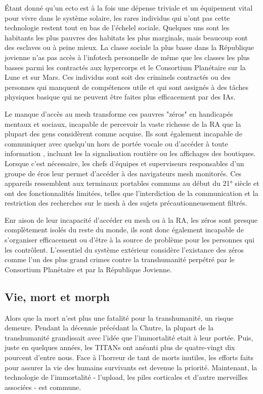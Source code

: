                Étant donné qu'un ecto est à la fois une dépense triviale et un équipement vital pour vivre dans le système solaire, les rares individus qui n'ont pas cette technologie restent tout en bas de l'échelel sociale. Quelques uns sont les habitants les plus pauvres des habitats les plus marginals, mais beaucoup sont des esclaves ou à peine mieux. La classe sociale la plus basse dans la République jovienne n'as pas accès à l'infotech personnelle de même que les classes les plus basses parmi les contractés aux hypercorps et le Consortium Planétaire sur la Lune et sur Mars. Ces individus sont soit des criminels contractés ou des personnes qui manquent de compétences utile et qui sont assignés à des tâches physiques basique qui ne peuvent être faites plus efficacement par des IAs. 

               Le manque d'accès au mesh transforme ces pauvres "zéros" en handicapés mentaux et sociaux, incapable de percevoir la vaste richesse de la RA que la plupart des gens considèrent comme acquise. Ils sont également incapable de communiquer avec quelqu'un hors de portée vocale ou d'accéder à toute information , incluant les la signalisation routière ou les affichages des boutiques. Lorsque c'est nécessaire, les chefs d'équipes et superviseurs responsables d'un groupe de éros leur permet d'accéder à des navigateurs mesh monitorés. Ces appareils ressemblent aux terminaux portables communs au début du 21° siècle et ont des fonctionnalités limitées, telles que l'interdiction de la communication et la restriction des recherches sur le mesh à des sujets précautionneusement filtrés. 

               Enr aison de leur incapacité d'accéder eu mesh ou à la RA, les zéros sont presque complètement isolés du reste du monde, ils sont donc également incapable de s'organiser efficacement ou d'être à la source de problème pour les personnes qui les contrôlent. L'essentiel du système extérieur considère l'existance des zéros comme l'un des plus grand crimes contre la transhumanité perpétré par le Consortium Planétaire et par la République Jovienne. 

               \subsection{Vie, mort et morph} \label{sec:life-death-morphs} 

               Alors que la mort n'est plus une fatalité pour la transhumanité, un risque demeure. Pendant la décennie précédant la Chutre, la plupart de la transhumanité grandissait avec l'idée que l'immortalité etait à leur portée. Puis, juste en quelques années, les TITANs ont anéanti plus de quatre-vingt dix pourcent d'entre nous. Face à l'horreur de tant de morts inutiles, les efforts faits pour assurer la vie des humains survivants est devenue la priorité. Maintenant, la technologie de l'immortalité - l'upload, les piles corticales et d'autre merveilles associées - est commune. 

